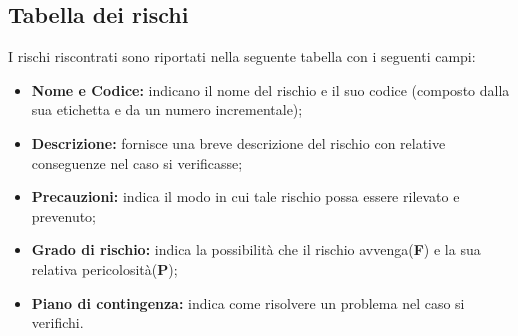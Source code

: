 \subsection{Tabella dei rischi}
I rischi riscontrati sono riportati nella seguente tabella con i seguenti campi:
\begin{itemize}
\item \textbf{Nome e Codice:} indicano il nome del rischio e il suo codice (composto dalla sua etichetta e da un numero incrementale);
\item \textbf{Descrizione:} fornisce una breve descrizione del rischio con relative conseguenze nel caso si verificasse;
\item \textbf{Precauzioni:} indica il modo in cui tale rischio possa essere rilevato e prevenuto;
\item \textbf{Grado di rischio:} indica la possibilità che il rischio avvenga(\textbf{F}) e la sua relativa pericolosità(\textbf{P});
\item \textbf{Piano di contingenza:} indica come risolvere un problema nel caso si verifichi.
\end{itemize}

